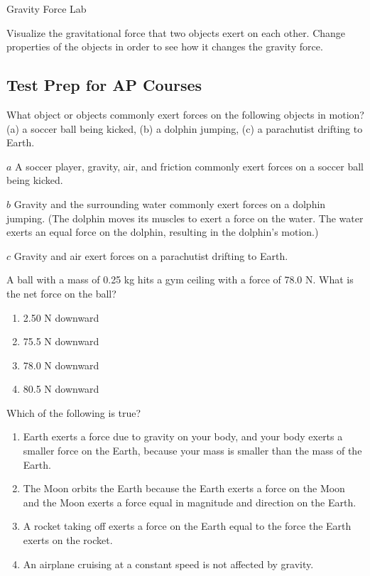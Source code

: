 \documentclass[
]{book}
\providecommand{\tightlist}{%
  \setlength{\itemsep}{0pt}\setlength{\parskip}{0pt}}
\begin{document}
\hypertarget{eip-984}{}
Gravity Force Lab

Visualize the gravitational force that two objects exert on each other.
Change properties of the objects in order to see how it changes the
gravity force.

\hypertarget{GravityForceLab}{}

\hypertarget{fs-id1635494}{}
\hypertarget{test-prep-for-ap-courses-10}{%
\subsection{Test Prep for AP Courses}\label{test-prep-for-ap-courses-10}}

\hypertarget{fs-id1642858}{}
\leavevmode{}%
What object or objects commonly exert forces on the following objects in
motion? (a) a soccer ball being kicked, (b) a dolphin jumping, (c) a
parachutist drifting to Earth.

\leavevmode{}%
\(a\) A soccer player, gravity, air, and friction commonly exert forces
on a soccer ball being kicked.

\(b\) Gravity and the surrounding water commonly exert forces on a
dolphin jumping. (The dolphin moves its muscles to exert a force on the
water. The water exerts an equal force on the dolphin, resulting in the
dolphin's motion.)

\(c\) Gravity and air exert forces on a parachutist drifting to Earth.

\hypertarget{fs-id1681743}{}
\leavevmode{}%
A ball with a mass of 0.25 kg hits a gym ceiling with a force of 78.0 N.
What is the net force on the ball?

\begin{enumerate}
\def\labelenumi{\alph{enumi}.}
\tightlist
\item
  2.50 N downward
\item
  75.5 N downward
\item
  78.0 N downward
\item
  80.5 N downward
\end{enumerate}

\hypertarget{fs-id1900456}{}
\leavevmode{}%
Which of the following is true?

\begin{enumerate}
\def\labelenumi{\alph{enumi}.}
\tightlist
\item
  Earth exerts a force due to gravity on your body, and your body
  exerts a smaller force on the Earth, because your mass is smaller
  than the mass of the Earth.
\item
  The Moon orbits the Earth because the Earth exerts a force on the
  Moon and the Moon exerts a force equal in magnitude and direction on
  the Earth.
\item
  A rocket taking off exerts a force on the Earth equal to the force
  the Earth exerts on the rocket.
\item
  An airplane cruising at a constant speed is not affected by gravity.
\end{enumerate}
\end{document}
